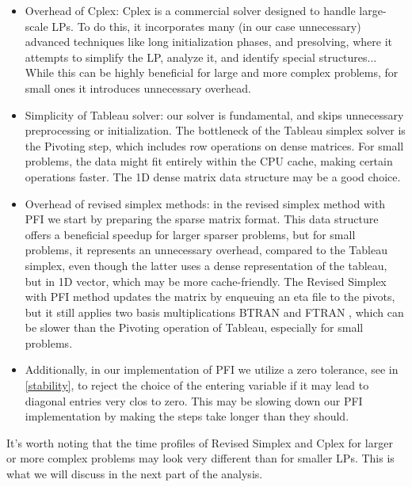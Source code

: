 \begin{itemize}
    \item Overhead of Cplex: Cplex is a commercial solver designed to handle
          large-scale LPs. To do this, it incorporates many (in our case unnecessary) advanced techniques like
          long initialization phases, and presolving,
          where it attempts to simplify the LP, analyze it, and identify special structures... While
          this can be highly beneficial for large and more complex problems, for small ones it
          introduces unnecessary overhead.
    \item Simplicity of Tableau solver: our solver is fundamental, and skips unnecessary
          preprocessing or initialization. The bottleneck of the Tableau simplex solver
          is the Pivoting step, which includes row operations on dense matrices.
          For small problems, the data might fit entirely within the CPU cache,
          making certain operations faster. The 1D dense matrix data structure may be a good
          choice.
    \item Overhead of revised simplex methods: in the revised simplex method with PFI we start by
          preparing the sparse matrix format. This data structure offers a beneficial speedup
          for larger sparser problems, but for small problems, it represents an unnecessary
          overhead, compared to the Tableau simplex, even though the latter uses a dense
          representation of the tableau, but in 1D vector, which may be more cache-friendly.
          The Revised Simplex with PFI method updates the matrix by enqueuing an eta file to the pivots,
          but it still applies two basis multiplications BTRAN and FTRAN
          , which can be slower than the Pivoting operation of Tableau, especially for
          small problems.

    \item Additionally, in our implementation of PFI we utilize a zero tolerance, see in \ref{stability}, to reject the choice of the entering variable if it may lead to diagonal entries very clos to zero. This may be slowing down our PFI implementation by making the steps take longer than they should.
\end{itemize}

It's worth noting that the time profiles of Revised Simplex and Cplex for larger or more complex problems may look very different than for smaller LPs.
This is what we will discuss in the next part of the analysis.

